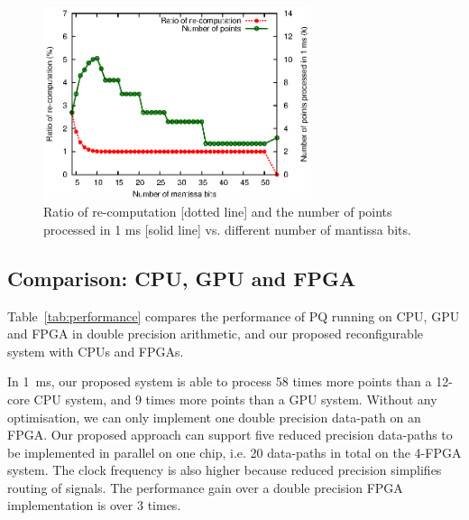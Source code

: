 \begin{figure}[ht]
\begin{center}
\includegraphics[width=0.7\textwidth]{mixed_precision/figures/fig_recompute}
\end{center}
\caption{Ratio of re-computation [dotted line] and 
the number of points processed in 1 ms [solid line] 
vs. different number of mantissa bits.}
\label{fig:recompute}
\end{figure}

\subsection{Comparison: CPU, GPU and FPGA}
Table~\ref{tab:performance} compares the performance of PQ running on CPU, GPU and FPGA in double precision arithmetic, 
and our proposed reconfigurable system with CPUs and FPGAs.


In 1~ms, our proposed system is able to process 58 times more points than a 12-core CPU system, and 9 times more points than a GPU system.
Without any optimisation, we can only implement one double precision data-path on an FPGA.
Our proposed approach can support five reduced precision data-paths to be implemented in parallel on one chip, i.e. 20 data-paths in total on the 4-FPGA system.
The clock frequency is also higher because reduced precision simplifies routing of signals.
The performance gain over a double precision FPGA implementation is over 3 times.

